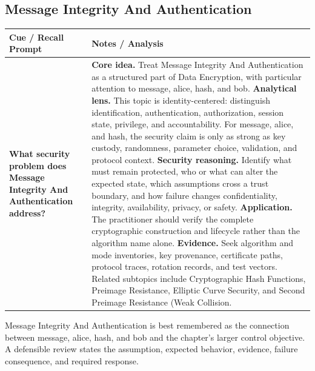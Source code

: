 \documentclass[11pt]{article}
\newcommand{\CornellHeader}{%
\rowcolor{Navy}\color{white}\bfseries Cue / Recall Prompt & \color{white}\bfseries Notes / Analysis\\\hline}
\newcommand{\CornellRow}[2]{%
\cellcolor{CueGray}\RaggedRight\textbf{#1} & \RaggedRight #2\\\hline}
\begin{document}
\subsection*{Message Integrity And Authentication}
\begin{longtable}{>{\RaggedRight\arraybackslash}p{}|>{\RaggedRight\arraybackslash}p{}}
\CornellHeader
\CornellRow{What security problem does Message Integrity And Authentication address?}{\textbf{Core idea.} Treat Message Integrity And Authentication as a structured part of Data Encryption, with particular attention to message, alice, hash, and bob. \textbf{Analytical lens.} This topic is identity-centered: distinguish identification, authentication, authorization, session state, privilege, and accountability. For message, alice, and hash, the security claim is only as strong as key custody, randomness, parameter choice, validation, and protocol context. \textbf{Security reasoning.} Identify what must remain protected, who or what can alter the expected state, which assumptions cross a trust boundary, and how failure changes confidentiality, integrity, availability, privacy, or safety. \textbf{Application.} The practitioner should verify the complete cryptographic construction and lifecycle rather than the algorithm name alone. \textbf{Evidence.} Seek algorithm and mode inventories, key provenance, certificate paths, protocol traces, rotation records, and test vectors. Related subtopics include Cryptographic Hash Functions, Preimage Resistance, Elliptic Curve Security, and Second Preimage Resistance (Weak Collision.}
\end{longtable}
\begin{topicsummary}
Message Integrity And Authentication is best remembered as the connection between message, alice, hash, and bob and the chapter's larger control objective. A defensible review states the assumption, expected behavior, evidence, failure consequence, and required response.
\end{topicsummary}
\end{document}
